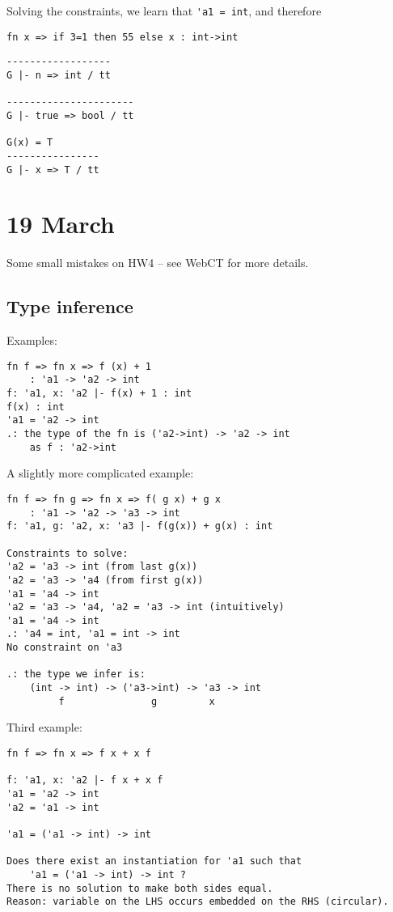 \documentclass[11pt]{article}
\begin{document}
Solving the constraints, we learn that \verb~'a1 = int~, and therefore
\begin{verbatim}
fn x => if 3=1 then 55 else x : int->int
\end{verbatim}

\begin{verbatim}
------------------
G |- n => int / tt

----------------------
G |- true => bool / tt

G(x) = T
----------------
G |- x => T / tt
\end{verbatim}

\section{19 March}
Some small mistakes on HW4 -- see WebCT for more details.

\subsection{Type inference}
Examples:
\begin{verbatim}
fn f => fn x => f (x) + 1
    : 'a1 -> 'a2 -> int
f: 'a1, x: 'a2 |- f(x) + 1 : int
f(x) : int
'a1 = 'a2 -> int
.: the type of the fn is ('a2->int) -> 'a2 -> int
    as f : 'a2->int
\end{verbatim}

A slightly more complicated example:
\begin{verbatim}
fn f => fn g => fn x => f( g x) + g x
    : 'a1 -> 'a2 -> 'a3 -> int
f: 'a1, g: 'a2, x: 'a3 |- f(g(x)) + g(x) : int

Constraints to solve:
'a2 = 'a3 -> int (from last g(x))
'a2 = 'a3 -> 'a4 (from first g(x))
'a1 = 'a4 -> int
'a2 = 'a3 -> 'a4, 'a2 = 'a3 -> int (intuitively)
'a1 = 'a4 -> int
.: 'a4 = int, 'a1 = int -> int
No constraint on 'a3

.: the type we infer is:
    (int -> int) -> ('a3->int) -> 'a3 -> int
         f               g         x
\end{verbatim}

Third example:
\begin{verbatim}
fn f => fn x => f x + x f

f: 'a1, x: 'a2 |- f x + x f
'a1 = 'a2 -> int
'a2 = 'a1 -> int

'a1 = ('a1 -> int) -> int

Does there exist an instantiation for 'a1 such that
    'a1 = ('a1 -> int) -> int ?
There is no solution to make both sides equal.
Reason: variable on the LHS occurs embedded on the RHS (circular).
\end{verbatim}
\end{document}
